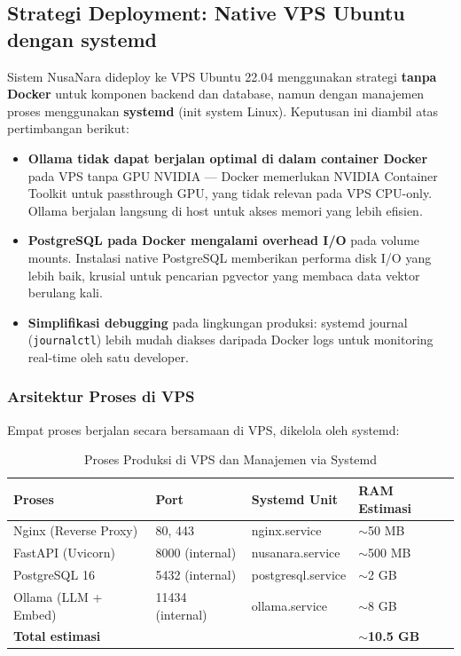 \subsection{Strategi Deployment: Native VPS Ubuntu dengan systemd}
\label{subsec:deployment_docker}

Sistem NusaNara dideploy ke VPS Ubuntu 22.04 menggunakan strategi \textbf{tanpa Docker}
untuk komponen backend dan database, namun dengan manajemen proses menggunakan
\textbf{systemd} (init system Linux). Keputusan ini diambil atas pertimbangan berikut:

\begin{itemize}
  \item \textbf{Ollama tidak dapat berjalan optimal di dalam container Docker}
    pada VPS tanpa GPU NVIDIA --- Docker memerlukan NVIDIA Container Toolkit
    untuk passthrough GPU, yang tidak relevan pada VPS CPU-only. Ollama berjalan
    langsung di host untuk akses memori yang lebih efisien.
  \item \textbf{PostgreSQL pada Docker mengalami overhead I/O} pada volume mounts.
    Instalasi native PostgreSQL memberikan performa disk I/O yang lebih baik,
    krusial untuk pencarian pgvector yang membaca data vektor berulang kali.
  \item \textbf{Simplifikasi debugging} pada lingkungan produksi: systemd journal
    (\texttt{journalctl}) lebih mudah diakses daripada Docker logs untuk
    monitoring real-time oleh satu developer.
\end{itemize}

\subsubsection{Arsitektur Proses di VPS}

Empat proses berjalan secara bersamaan di VPS, dikelola oleh systemd:

\begin{table}[H]
\centering
\caption{Proses Produksi di VPS dan Manajemen via Systemd}
\label{tab:proses_vps}
\begin{tabular}{llll}
\toprule
\textbf{Proses} & \textbf{Port} & \textbf{Systemd Unit} & \textbf{RAM Estimasi} \\
\midrule
Nginx (Reverse Proxy) & 80, 443 & nginx.service & $\sim$50 MB \\
FastAPI (Uvicorn) & 8000 (internal) & nusanara.service & $\sim$500 MB \\
PostgreSQL 16 & 5432 (internal) & postgresql.service & $\sim$2 GB \\
Ollama (LLM + Embed) & 11434 (internal) & ollama.service & $\sim$8 GB \\
\midrule
\multicolumn{3}{l}{\textbf{Total estimasi}} & \textbf{$\sim$10.5 GB} \\
\bottomrule
\end{tabular}
\end{table}

